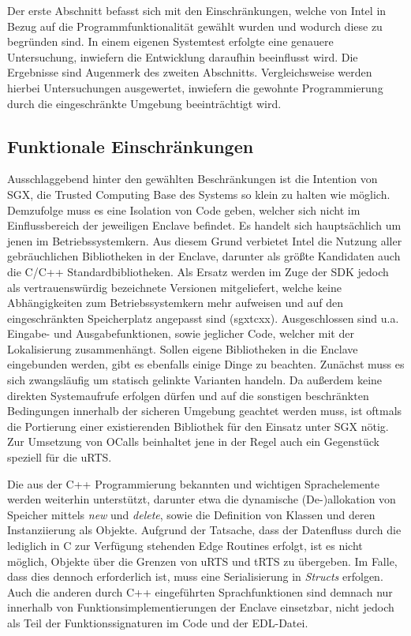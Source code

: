 Der erste Abschnitt befasst sich mit den Einschränkungen, welche von Intel in Bezug auf die Programmfunktionalität gewählt wurden und wodurch diese zu begründen sind. In einem eigenen Systemtest erfolgte eine genauere Untersuchung, inwiefern die Entwicklung daraufhin beeinflusst wird. Die Ergebnisse sind Augenmerk des zweiten Abschnitts. Vergleichsweise werden hierbei Untersuchungen ausgewertet, inwiefern die gewohnte Programmierung durch die eingeschränkte Umgebung beeinträchtigt wird.

\subsection{Funktionale Einschränkungen}

Ausschlaggebend hinter den gewählten Beschränkungen ist die Intention von \ac{SGX}, die Trusted Computing Base des Systems so klein zu halten wie möglich. Demzufolge muss es eine Isolation von Code geben, welcher sich nicht im Einflussbereich der jeweiligen Enclave befindet. Es handelt sich hauptsächlich um jenen im Betriebssystemkern. Aus diesem Grund verbietet Intel die Nutzung aller gebräuchlichen Bibliotheken in der Enclave, darunter als größte Kandidaten auch die C/C++ Standardbibliotheken. Als Ersatz werden im Zuge der \ac{SDK} jedoch als vertrauenswürdig bezeichnete Versionen mitgeliefert, welche keine Abhängigkeiten zum Betriebssystemkern mehr aufweisen und auf den eingeschränkten Speicherplatz angepasst sind (sgx\textunderscore tcxx). Ausgeschlossen sind u.a. Eingabe- und Ausgabefunktionen, sowie jeglicher Code, welcher mit der Lokalisierung zusammenhängt. Sollen eigene Bibliotheken in die Enclave eingebunden werden, gibt es ebenfalls einige Dinge zu beachten. Zunächst muss es sich zwangsläufig um statisch gelinkte Varianten handeln. Da außerdem keine direkten Systemaufrufe erfolgen dürfen und auf die sonstigen beschränkten Bedingungen innerhalb der sicheren Umgebung geachtet werden muss, ist oftmals die Portierung einer existierenden Bibliothek für den Einsatz unter \ac{SGX} nötig. Zur Umsetzung von \acp{OCall} beinhaltet jene in der Regel auch ein Gegenstück speziell für die \ac{uRTS}.
 
Die aus der C++ Programmierung bekannten und wichtigen Sprachelemente werden weiterhin unterstützt, darunter etwa die dynamische (De-)allokation von Speicher mittels \textit{new} und \textit{delete}, sowie die Definition von Klassen und deren Instanziierung als Objekte. Aufgrund der Tatsache, dass der Datenfluss durch die lediglich in C zur Verfügung stehenden Edge Routines erfolgt, ist es nicht möglich, Objekte über die Grenzen von \ac{uRTS} und \ac{tRTS} zu übergeben. Im Falle, dass dies dennoch erforderlich ist, muss eine Serialisierung in \textit{Structs} erfolgen. Auch die anderen durch C++ eingeführten Sprachfunktionen sind demnach nur innerhalb von Funktionsimplementierungen der Enclave einsetzbar, nicht jedoch als Teil der Funktionssignaturen im Code und der \ac{EDL}-Datei.

